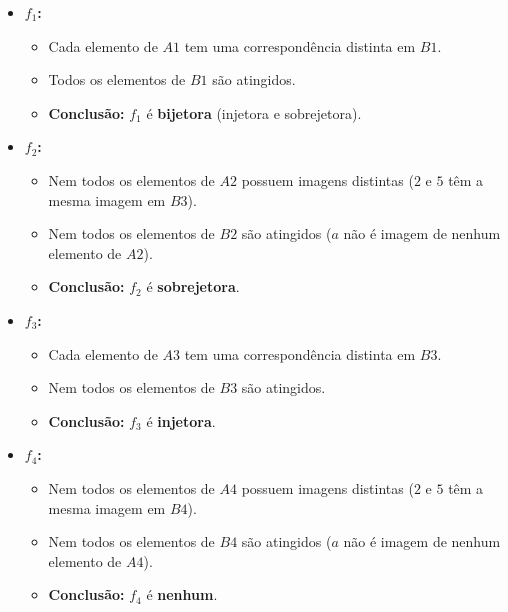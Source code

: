 \documentclass{article}
\begin{document}
\begin{itemize}
    \item \textbf{\(f_1\):}
    \begin{itemize}
        \item Cada elemento de \(A1\) tem uma correspondência distinta em \(B1\).
        \item Todos os elementos de \(B1\) são atingidos.
        \item \textbf{Conclusão:} \(f_1\) é \textbf{bijetora} (injetora e sobrejetora).
    \end{itemize}
    \item \textbf{\(f_2\):}
    \begin{itemize}
        \item Nem todos os elementos de \(A2\) possuem imagens distintas (\(2\) e \(5\) têm a mesma imagem em \(B3\)).
        \item Nem todos os elementos de \(B2\) são atingidos (\(a\) não é imagem de nenhum elemento de \(A2\)).
        \item \textbf{Conclusão:} \(f_2\) é \textbf{sobrejetora}.
    \end{itemize}
    \item \textbf{\(f_3\):}
    \begin{itemize}
        \item Cada elemento de \(A3\) tem uma correspondência distinta em \(B3\).
        \item Nem todos os elementos de \(B3\) são atingidos.
        \item \textbf{Conclusão:} \(f_3\) é \textbf{injetora}.
    \end{itemize}
    \item \textbf{\(f_4\):}
    \begin{itemize}
        \item Nem todos os elementos de \(A4\) possuem imagens distintas (\(2\) e \(5\) têm a mesma imagem em \(B4\)).
        \item Nem todos os elementos de \(B4\) são atingidos (\(a\) não é imagem de nenhum elemento de \(A4\)).
        \item \textbf{Conclusão:} \(f_4\) é \textbf{nenhum}.
    \end{itemize}
\end{itemize}
\end{document}
